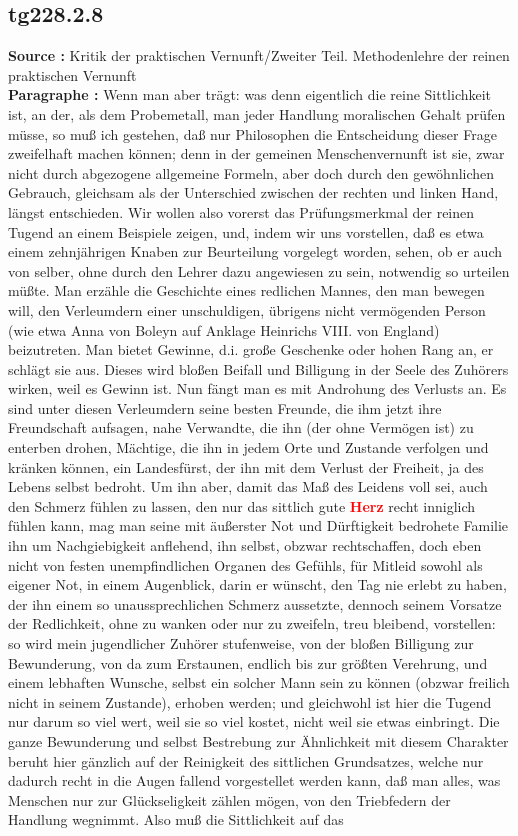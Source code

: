 \documentclass[a4paper,12pt,twoside]{book}
\newcommand{\match}[1]{\textcolor{red}{\textbf{#1}}}
\begin{document}
	\subsection*{tg228.2.8} 
	\textbf{Source : }Kritik der praktischen Vernunft/Zweiter Teil. Methodenlehre der reinen praktischen Vernunft\\  
	
	\noindent\textbf{Paragraphe : }
	Wenn man aber trägt: was denn eigentlich die reine Sittlichkeit ist, an der, als dem Probemetall, man jeder Handlung moralischen Gehalt prüfen müsse, so muß ich gestehen, daß nur Philosophen die Entscheidung dieser Frage zweifelhaft machen können; denn in der gemeinen Menschenvernunft ist sie, zwar nicht durch abgezogene allgemeine Formeln, aber doch durch den gewöhnlichen Gebrauch, gleichsam als der Unterschied zwischen der rechten und linken Hand, längst entschieden. Wir wollen also vorerst das Prüfungsmerkmal der reinen Tugend an einem Beispiele zeigen, und, indem wir uns vorstellen, daß es etwa einem zehnjährigen Knaben zur Beurteilung vorgelegt worden, sehen, ob er auch von selber, ohne durch den Lehrer dazu angewiesen zu sein, notwendig so urteilen müßte. Man erzähle die Geschichte eines redlichen Mannes, den man bewegen will, den Verleumdern einer unschuldigen, übrigens nicht vermögenden Person (wie etwa Anna von Boleyn auf Anklage Heinrichs VIII. von England) beizutreten. Man bietet Gewinne, d.i. große Geschenke oder hohen Rang an, er schlägt sie aus. Dieses wird bloßen Beifall und Billigung in der Seele des Zuhörers wirken, weil es Gewinn ist. Nun fängt man es mit Androhung des Verlusts an. Es sind unter diesen Verleumdern seine besten Freunde, die ihm jetzt ihre Freundschaft aufsagen, nahe Verwandte, die ihn (der ohne Vermögen ist) zu enterben drohen, Mächtige, die ihn in jedem Orte und Zustande verfolgen und kränken können, ein Landesfürst, der ihn mit dem Verlust der Freiheit, ja des Lebens selbst bedroht. Um ihn aber, damit das Maß des Leidens voll sei, auch den Schmerz fühlen zu lassen, den nur  das sittlich gute \match{Herz} recht inniglich fühlen kann, mag man seine mit äußerster Not und Dürftigkeit bedrohete Familie ihn um Nachgiebigkeit anflehend, ihn selbst, obzwar rechtschaffen, doch eben nicht von festen unempfindlichen Organen des Gefühls, für Mitleid sowohl als eigener Not, in einem Augenblick, darin er wünscht, den Tag nie erlebt zu haben, der ihn einem so unaussprechlichen Schmerz aussetzte, dennoch seinem Vorsatze der Redlichkeit, ohne zu wanken oder nur zu zweifeln, treu bleibend, vorstellen: so wird mein jugendlicher Zuhörer stufenweise, von der bloßen Billigung zur Bewunderung, von da zum Erstaunen, endlich bis zur größten Verehrung, und einem lebhaften Wunsche, selbst ein solcher Mann sein zu können (obzwar freilich nicht in seinem Zustande), erhoben werden; und gleichwohl ist hier die Tugend nur darum so viel wert, weil sie so viel kostet, nicht weil sie etwas einbringt. Die ganze Bewunderung und selbst Bestrebung zur Ähnlichkeit mit diesem Charakter beruht hier gänzlich auf der Reinigkeit des sittlichen Grundsatzes, welche nur dadurch recht in die Augen fallend vorgestellet werden kann, daß man alles, was Menschen nur zur Glückseligkeit zählen mögen, von den Triebfedern der Handlung wegnimmt. Also muß die Sittlichkeit auf das 
\end{document}
